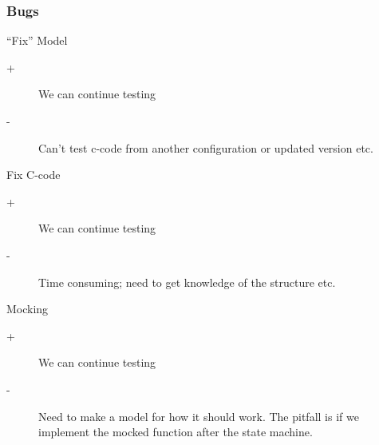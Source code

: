 \documentclass{beamer}
\begin{document}
\begin{frame}
  \frametitle{Bugs}
  \begin{block}{``Fix'' Model}
    \begin{description}
      \item[+] We can continue testing
      \item[-] Can't test c-code from another configuration or updated version etc.
    \end{description}
  \end{block}

  \begin{block}{Fix C-code}
    \begin{description}
      \item[+] We can continue testing
      \item[-] Time consuming; need to get knowledge of the structure etc.
    \end{description}
  \end{block}

  \begin{block}{Mocking}
    \begin{description}
      \item[+] We can continue testing
      \item[-] Need to make a model for how it should work. The
        pitfall is if we implement the mocked function after the state
        machine.
    \end{description}
  \end{block}
\end{frame}

\end{document}
